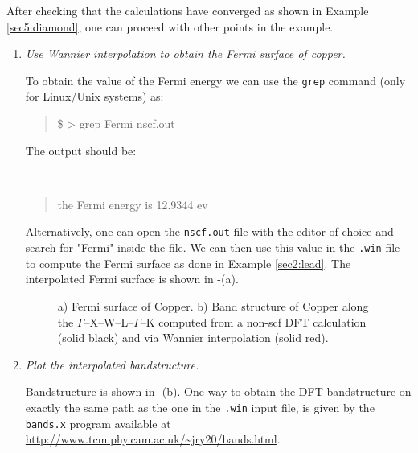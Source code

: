 After checking that the calculations have converged as shown in Example \ref{sec5:diamond}, one can proceed with other points in the example.
\begin{enumerate}
	\item {\it Use Wannier interpolation to obtain the Fermi surface of copper.}

	To obtain the value of the Fermi energy we can use the {\tt grep} command (only for Linux/Unix systems) as:
	{\tt\begin{quote}
	\$ > grep Fermi nscf.out
	\end{quote}
    }
	The output should be:
	{\tt
    \begin{quote}
	     the Fermi energy is    12.9344 ev
	\end{quote}
    }
	Alternatively, one can open the {\tt nscf.out} file with the editor of choice and search for "Fermi" inside the file.
	We can then use this value in the {\tt .win} file to compute the Fermi surface as done in Example \ref{sec2:lead}.
	The interpolated Fermi surface is shown in -(a).
	\begin{figure}[h!]
	\centering
	\centering
	\caption{a) Fermi surface of Copper. b) Band structure of Copper along the $\Gamma$--X--W--L--$\Gamma$--K computed from a non-scf DFT calculation (solid black) and via Wannier interpolation (solid red).}\label{fig6.1}
	\end{figure}
	\item {\it Plot the interpolated bandstructure.}

	Bandstructure is shown in -(b). One way to obtain the DFT bandstructure on exactly the same path as the one in the {\tt .win} input file, is given by the {\tt bands.x} program available at \url{http://www.tcm.phy.cam.ac.uk/~jry20/bands.html}.
\end{enumerate}
